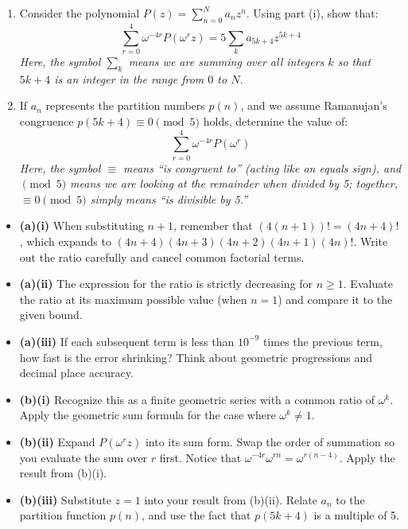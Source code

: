 \begin{problem}
\begin{enumerate}
\begin{enumerate}
        \item[(ii)] Consider the polynomial $P(z) = \sum_{n=0}^{N} a_n z^n$. Using part (i), show that:
        \[
        \sum_{r=0}^{4} \omega^{-4r} P(\omega^r z) = 5 \sum_{k} a_{5k+4} z^{5k+4}
        \]
        \textit{Here, the symbol $\sum_{k}$ means we are summing over all integers $k$ so that $5k+4$ is an integer in the range from $0$ to $N$.}

        \item[(iii)] If $a_n$ represents the partition numbers $p(n)$, and we assume Ramanujan's congruence $p(5k+4) \equiv 0 \pmod 5$ holds, determine the value of:
        \[
        \sum_{r=0}^{4} \omega^{-4r} P(\omega^r)
        \]
        \textit{Here, the symbol $\equiv$ means ``is congruent to'' (acting like an equals sign), and $\pmod 5$ means we are looking at the remainder when divided by 5; together, $\equiv 0 \pmod 5$ simply means ``is divisible by 5.''}
    \end{enumerate}
\end{enumerate}

\end{problem}

\begin{hint}
\begin{itemize}
    \item \textbf{(a)(i)} When substituting $n+1$, remember that $(4(n+1))! = (4n+4)!$, which expands to $(4n+4)(4n+3)(4n+2)(4n+1)(4n)!$. Write out the ratio carefully and cancel common factorial terms.
    \item \textbf{(a)(ii)} The expression for the ratio is strictly decreasing for $n \ge 1$. Evaluate the ratio at its maximum possible value (when $n=1$) and compare it to the given bound.
    \item \textbf{(a)(iii)} If each subsequent term is less than $10^{-9}$ times the previous term, how fast is the error shrinking? Think about geometric progressions and decimal place accuracy.
    \item \textbf{(b)(i)} Recognize this as a finite geometric series with a common ratio of $\omega^k$. Apply the geometric sum formula for the case where $\omega^k \neq 1$.
    \item \textbf{(b)(ii)} Expand $P(\omega^r z)$ into its sum form. Swap the order of summation so you evaluate the sum over $r$ first. Notice that $\omega^{-4r} \omega^{rn} = \omega^{r(n-4)}$. Apply the result from (b)(i).
    \item \textbf{(b)(iii)} Substitute $z=1$ into your result from (b)(ii). Relate $a_n$ to the partition function $p(n)$, and use the fact that $p(5k+4)$ is a multiple of 5.
\end{itemize}
\end{hint}

